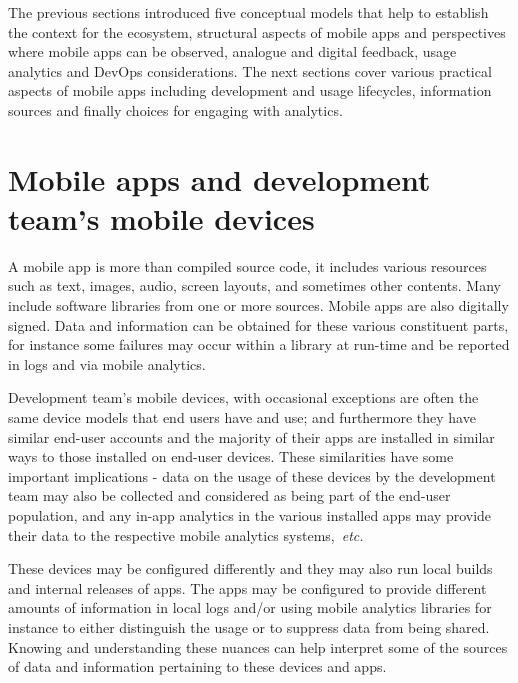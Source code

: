 The previous sections introduced five conceptual models that help to establish the context for the ecosystem, structural aspects of mobile apps and perspectives where mobile apps can be observed, analogue and digital feedback, usage analytics and DevOps considerations. The next sections cover various practical aspects of mobile apps including development and usage lifecycles, information sources and finally choices for engaging with analytics.


\section{Mobile apps and development team's mobile devices}
A mobile app is more than compiled source code, it includes various resources such as text, images, audio, screen layouts, and sometimes other contents. Many include software libraries from one or more sources. Mobile apps are also digitally signed. Data and information can be obtained for these various constituent parts, for instance some failures may occur within a library at run-time and be reported in logs and via mobile analytics.

Development team's mobile devices, with occasional exceptions are often the same device models that end users have and use; and furthermore they have similar end-user accounts and the majority of their apps are installed in similar ways to those installed on end-user devices. These similarities have some important implications - data on the usage of these devices by the development team may also be collected and considered as being part of the end-user population, and any in-app analytics in the various installed apps may provide their data to the respective mobile analytics systems,~\emph{etc.}

These devices may be configured differently and they may also run local builds and internal releases of apps. The apps may be configured to provide different amounts of information in local logs and/or using mobile analytics libraries for instance to either distinguish the usage or to suppress data from being shared. Knowing and understanding these nuances can help interpret some of the sources of data and information pertaining to these devices and apps.



